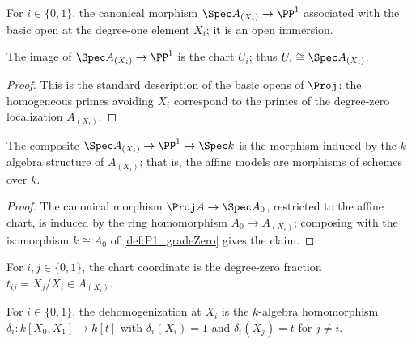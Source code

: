 \begin{definition}
  \label{def:P1_chartIota}
  \leanok
  For \(i \in \{0,1\}\), the canonical morphism \(\Spec A_{(X_i)} \to \PP^1\) associated with
  the basic open at the degree-one element \(X_i\); it is an open immersion.
\end{definition}

\begin{lemma}
  \label{lem:P1_chartIota_range}
  \leanok
  The image of \(\Spec A_{(X_i)} \to \PP^1\) is the chart \(U_i\); thus
  \(U_i \cong \Spec A_{(X_i)}\).
\end{lemma}
\begin{proof}
  \leanok
  This is the standard description of the basic opens of \(\Proj\): the homogeneous primes
  avoiding \(X_i\) correspond to the primes of the degree-zero localization \(A_{(X_i)}\).
\end{proof}

\begin{lemma}
  \label{lem:P1_chartIota_structureMap}
  \leanok
  The composite \(\Spec A_{(X_i)} \to \PP^1 \to \Spec k\) is the morphism induced by the
  \(k\)-algebra structure of \(A_{(X_i)}\); that is, the affine models are morphisms of
  schemes over \(k\).
\end{lemma}
\begin{proof}
  \leanok
  The canonical morphism \(\Proj A \to \Spec A_0\), restricted to the affine chart, is induced
  by the ring homomorphism \(A_0 \to A_{(X_i)}\); composing with the isomorphism
  \(k \cong A_0\) of \ref{def:P1_gradeZero} gives the claim.
\end{proof}

\begin{definition}
  \label{def:P1_chartCoord}
  \leanok
  For \(i, j \in \{0,1\}\), the chart coordinate is the degree-zero fraction
  \(t_{ij} = X_j / X_i \in A_{(X_i)}\).
\end{definition}

\begin{definition}[Dehomogenization]
  \label{def:P1_dehomogenize}
  \leanok
  For \(i \in \{0,1\}\), the dehomogenization at \(X_i\) is the \(k\)-algebra homomorphism
  \(\delta_i : k[X_0, X_1] \to k[t]\) with \(\delta_i(X_i) = 1\) and \(\delta_i(X_j) = t\) for
  \(j \neq i\).
\end{definition}

